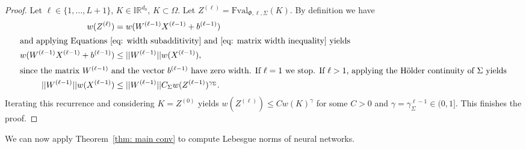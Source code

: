 \documentclass[a4paper, 11pt]{article}
\begin{document}
	\begin{proof}
		Let $\ell\in\{1, \dotsc, L+1\}$, $K\in \mathbb{IR}^{d_0}, \, K \subset \Omega$. Let $Z^{(\ell)} = \mathrm{Fval}_{\Phi, \ell, \Sigma}(K)$. By definition we have
		\begin{align*}
			w(Z^{(\ell)}) &= w(W^{(\ell-1)}X^{(\ell-1)} + b^{(\ell-1)}) \\
			\intertext{and applying Equations~\eqref{eq: width subadditivity} and~\eqref{eq: matrix width inequality} yields}
			w(W^{(\ell-1)}X^{(\ell-1)} + b^{(\ell-1)}) &\leq ||W^{(\ell-1)}||w(X^{(\ell-1)}), \\
			\intertext{since the matrix $W^{(\ell -1)}$ and the vector $b^{(\ell-1)}$ have zero width. If $\ell=1$ we stop. If $\ell>1$, applying the Hölder continuity of $\Sigma$ yields}
			||W^{(\ell-1)}||w(X^{(\ell-1)}) &\leq ||W^{(\ell-1)}||C_\Sigma w(Z^{(\ell-1)})^{\gamma_\Sigma}.
		\end{align*}
        Iterating this recurrence and considering $K = Z^{(0)}$ yields $w(Z^{(\ell)}) \leq C w(K)^{\gamma}$ for some $C > 0$ and $\gamma = \gamma_\Sigma^{\ell-1} \in (0,1]$.
		This finishes the proof.
	\end{proof}
	
	We can now apply Theorem~\ref{thm: main conv} to compute Lebesgue norms of neural networks. 
	
\end{document}
